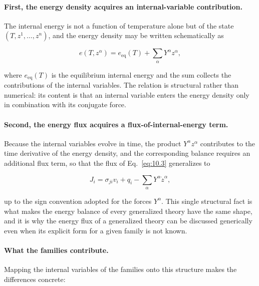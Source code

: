 \paragraph{First, the energy density acquires an internal-variable contribution.}
The internal energy is not a function of temperature alone but of the state $(T, z^1, \dots, z^n)$, and the energy density may be written schematically as

\begin{equation}
e(T, z^\alpha) = e_{\mathrm{eq}}(T) + \sum_{\alpha} Y^\alpha z^\alpha,
\label{eq:10.7}
\end{equation}

where $e_{\mathrm{eq}}(T)$ is the equilibrium internal energy and the sum collects the contributions of the internal variables. The relation is structural rather than numerical: its content is that an internal variable enters the energy density only in combination with its conjugate force.

\paragraph{Second, the energy flux acquires a flux-of-internal-energy term.}
Because the internal variables evolve in time, the product $Y^\alpha z^\alpha$ contributes to the time derivative of the energy density, and the corresponding balance requires an additional flux term, so that the flux of Eq.~\eqref{eq:10.3} generalizes to

\begin{equation}
J_i = \sigma_{ji}v_i + q_i - \sum_{\alpha} Y^\alpha \dot{z}^\alpha ,
\label{eq:10.8}
\end{equation}

up to the sign convention adopted for the forces $Y^\alpha$. This single structural fact is what makes the energy balance of every generalized theory have the same shape, and it is why the energy flux of a generalized theory can be discussed generically even when its explicit form for a given family is not known.

\paragraph{What the families contribute.}
Mapping the internal variables of the families onto this structure makes the differences concrete:


